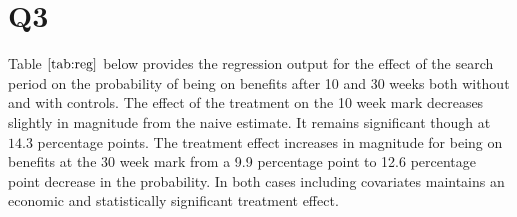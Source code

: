 \documentclass[
]{article}
\begin{document}
\hypertarget{q3}{%
\section{Q3}\label{q3}}

Table \(\ref{tab:reg}\) below provides the regression output for the
effect of the search period on the probability of being on benefits
after 10 and 30 weeks both without and with controls. The effect of the
treatment on the 10 week mark decreases slightly in magnitude from the
naive estimate. It remains significant though at \(14.3\) percentage
points. The treatment effect increases in magnitude for being on
benefits at the 30 week mark from a 9.9 percentage point to 12.6
percentage point decrease in the probability. In both cases including
covariates maintains an economic and statistically significant treatment
effect.
\end{document}
